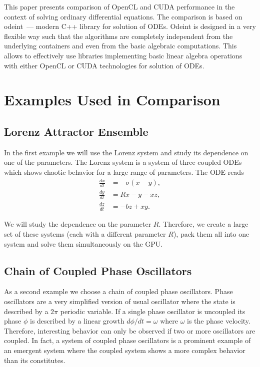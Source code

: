 \documentclass[1p]{elsarticle}
\begin{document}
This paper presents comparison of OpenCL and CUDA performance in the context of
solving ordinary differential equations. The comparison is based on odeint~---
modern C++ library for solution of ODEs. Odeint is designed in a very flexible
way such that the algorithms are completely independent from the underlying
containers and even from the basic algebraic computations. This allows to
effectively use libraries implementing basic linear algebra operations with
either OpenCL or CUDA technologies for solution of ODEs.

\section{Examples Used in Comparison}
\subsection{Lorenz Attractor Ensemble}

In the first example we will use the Lorenz system and study its dependence on
one of the parameters. The Lorenz system is a system of three coupled ODEs
which shows chaotic behavior for a large range of parameters. The ODE reads
\begin{align}
    \frac{dx}{dt} &= -\sigma \left( x - y \right), \\
    \frac{dy}{dt} &= R x - y - xz, \\
    \frac{dz}{dt} &= -bz + xy.
\end{align}

We will study the dependence on the parameter $R$. Therefore, we create a large
set of these systems (each with a different parameter $R$), pack them all into
one system and solve them simultaneously on the GPU.

\subsection{Chain of Coupled Phase Oscillators}

As a second example we choose a chain of coupled phase oscillators. Phase
oscillators are a very simplified version of usual oscillator where the state
is described by a $2\pi$ periodic variable. If a single phase oscillator is
uncoupled its phase $\phi$ is described by a linear growth $d\phi/dt = \omega$
where $\omega$ is the phase velocity. Therefore, interesting behavior can only
be observed if two or more oscillators are coupled. In fact, a system of
coupled phase oscillators is a prominent example of an emergent system where
the coupled system shows a more complex behavior than its constitutes.
\end{document}
